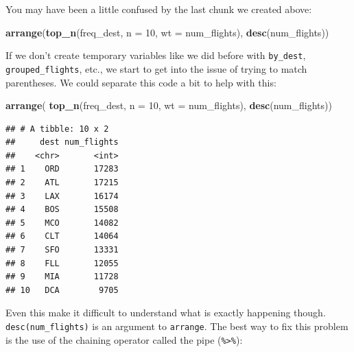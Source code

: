 \documentclass[]{tufte-book}
\newenvironment{Shaded}{\begin{snugshade}}{\end{snugshade}}
\newcommand{\KeywordTok}[1]{\textcolor[rgb]{0.13,0.29,0.53}{\textbf{{#1}}}}
\newcommand{\DataTypeTok}[1]{\textcolor[rgb]{0.13,0.29,0.53}{{#1}}}
\newcommand{\DecValTok}[1]{\textcolor[rgb]{0.00,0.00,0.81}{{#1}}}
\newcommand{\StringTok}[1]{\textcolor[rgb]{0.31,0.60,0.02}{{#1}}}
\newcommand{\NormalTok}[1]{{#1}}
\begin{document}
You may have been a little confused by the last chunk we created above:

\begin{Shaded}
\begin{Highlighting}[]
\KeywordTok{arrange}\NormalTok{(}\KeywordTok{top_n}\NormalTok{(freq_dest, }\DataTypeTok{n =} \DecValTok{10}\NormalTok{, }\DataTypeTok{wt =} \NormalTok{num_flights), }\KeywordTok{desc}\NormalTok{(num_flights))}
\end{Highlighting}
\end{Shaded}

If we don't create temporary variables like we did before with
\texttt{by\_dest}, \texttt{grouped\_flights}, etc., we start to get into
the issue of trying to match parentheses. We could separate this code a
bit to help with this:

\begin{Shaded}
\begin{Highlighting}[]
\KeywordTok{arrange}\NormalTok{(}
  \KeywordTok{top_n}\NormalTok{(freq_dest, }
        \DataTypeTok{n =} \DecValTok{10}\NormalTok{,}
        \DataTypeTok{wt =} \NormalTok{num_flights), }
  \KeywordTok{desc}\NormalTok{(num_flights))}
\end{Highlighting}
\end{Shaded}

\begin{verbatim}
## # A tibble: 10 x 2
##     dest num_flights
##    <chr>       <int>
## 1    ORD       17283
## 2    ATL       17215
## 3    LAX       16174
## 4    BOS       15508
## 5    MCO       14082
## 6    CLT       14064
## 7    SFO       13331
## 8    FLL       12055
## 9    MIA       11728
## 10   DCA        9705
\end{verbatim}

Even this make it difficult to understand what is exactly happening
though. \texttt{desc(num\_flights)} is an argument to \texttt{arrange}.
The best way to fix this problem is the use of the chaining operator
called the pipe (\texttt{\%\textgreater{}\%}):

\begin{Shaded}
\end{Shaded}
\end{document}
